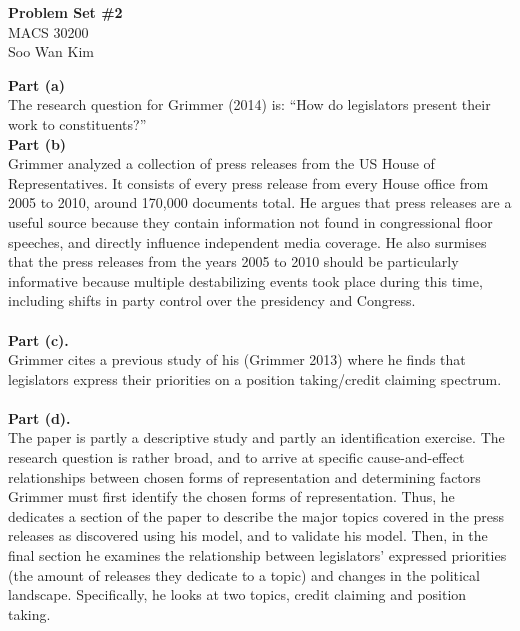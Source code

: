 \documentclass[letterpaper,12pt]{article}
\theoremstyle{definition}
\begin{document}
\begin{flushleft}
  \textbf{\large{Problem Set \#2}} \\
  MACS 30200\\
  Soo Wan Kim
\end{flushleft}

\noindent\textbf {Part (a)}
\vspace{5mm}
\\
\indent
The research question for Grimmer (2014) is: “How do legislators present their work to constituents?” \\

\noindent
\textbf {Part (b)} 
\vspace{5mm}
\\
\indent
Grimmer analyzed a collection of press releases from the US House of Representatives. It consists of every press release from every House office from 2005 to 2010, around 170,000 documents total. He argues that press releases are a useful source because they contain information not found in congressional floor speeches, and directly influence independent media coverage. He also surmises that the press releases from the years 2005 to 2010 should be particularly informative because multiple destabilizing events took place during this time, including shifts in party control over the presidency and Congress.
\\\\
\noindent\textbf {Part (c).} 
\vspace{5mm}
\\
\indent
Grimmer cites a previous study of his (Grimmer 2013) where he finds that legislators express their priorities on a position taking/credit claiming spectrum. 
\\\\
\noindent\textbf {Part (d).} 
\vspace{5mm}
\\
\indent
The paper is partly a descriptive study and partly an identification exercise. The research question is rather broad, and to arrive at specific cause-and-effect relationships between chosen forms of representation and determining factors Grimmer must first identify the chosen forms of representation. Thus, he dedicates a section of the paper to describe the major topics covered in the press releases as discovered using his model, and to validate his model. Then, in the final section he examines the relationship between legislators’ expressed priorities (the amount of releases they dedicate to a topic) and changes in the political landscape. Specifically, he looks at two topics, credit claiming and position taking.
\end{document}
